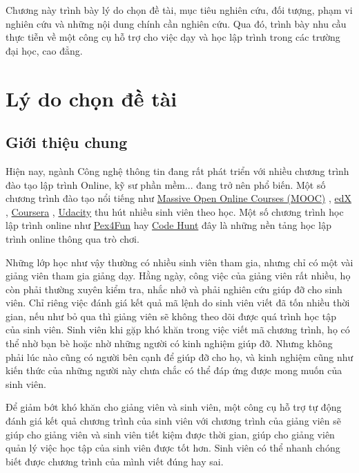 Chương này trình bày lý do chọn đề tài, mục tiêu nghiên cứu, đối tượng, phạm vi nghiên cứu và những nội dung chính cần nghiên cứu. Qua đó, trình bày nhu cầu thực tiễn về một công cụ hỗ trợ cho việc dạy và học lập trình trong các trường đại học, cao đẳng.

\section{Lý do chọn đề tài}

\subsection{Giới thiệu chung}

Hiện nay, ngành Công nghệ thông tin đang rất phát triển với nhiều chương trình đào tạo lập trình Online, kỹ sư phần mềm... đang trở nên phổ biến. Một số chương trình đào tạo nổi tiếng như \href{https://www.coursera.org/course/saas}{Massive Open Online Courses (MOOC)} \cite{mooc}, \href{https://www.edx.org/}{edX} \cite{edx}, \href{https://www.coursera.org/}{Coursera} \cite{coursera}, \href{http://www.udacity.com/}{Udacity} \cite{Udacity} thu hút nhiều sinh viên theo học. Một số chương trình học lập trình online như \href{https://www.pexforfun.com/}{Pex4Fun} \cite{Pex4Fun} hay \href{https://www.microsoft.com/en-us/research/project/code-hunt/}{Code Hunt} \cite{CodeHunt} đây là những nền tảng học lập trình online thông qua trò chơi. 

Những lớp học như vậy thường có nhiều sinh viên tham gia, nhưng chỉ có một vài giảng viên tham gia giảng dạy. Hằng ngày, công việc của giảng viên rất nhiều, họ còn phải thường xuyên kiểm tra, nhắc nhở và phải nghiên cứu giúp đỡ cho sinh viên. Chỉ riêng việc đánh giá kết quả mã lệnh do sinh viên viết đã tốn nhiều thời gian, nếu như bỏ qua thì giảng viên sẽ không theo dõi được quá trình học tập của sinh viên. Sinh viên khi gặp khó khăn trong việc viết mã chương trình, họ có thể nhờ bạn bè hoặc nhờ những người có kinh nghiệm giúp đỡ. Nhưng không phải lúc nào cũng có người bên cạnh để giúp đỡ cho họ, và kinh nghiệm cũng như kiến thức của những người này chưa chắc có thể đáp ứng được mong muốn của sinh viên.

Để giảm bớt khó khăn cho giảng viên và sinh viên, một công cụ hỗ trợ tự động đánh giá kết quả chương trình của sinh viên với chương trình của giảng viên sẽ giúp cho giảng viên và sinh viên tiết kiệm được thời gian, giúp cho giảng viên quản lý việc học tập của sinh viên được tốt hơn. Sinh viên có thể nhanh chóng biết được chương trình của mình viết đúng hay sai. 

